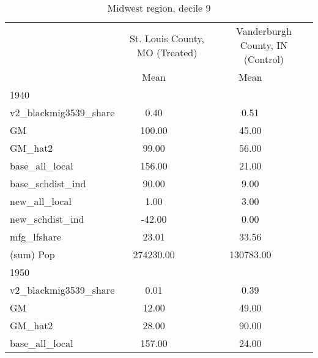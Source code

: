 \begin{table}[htbp]\centering
\def\sym#1{\ifmmode^{#1}\else\(^{#1}\)\fi}
\caption{Midwest region, decile 9 \label{tab1}}
\begin{tabular}{l*{2}{ccc}}
\toprule
                    &\multicolumn{3}{c}{St. Louis County, MO (Treated)}&\multicolumn{3}{c}{Vanderburgh County, IN (Control)}\\
                    &        Mean&            &            &        Mean&            &            \\
\midrule
1940                &            &            &            &            &            &            \\
v2\_blackmig3539\_share&        0.40&            &            &        0.51&            &            \\
GM                  &      100.00&            &            &       45.00&            &            \\
GM\_hat2             &       99.00&            &            &       56.00&            &            \\
base\_all\_local      &      156.00&            &            &       21.00&            &            \\
base\_schdist\_ind    &       90.00&            &            &        9.00&            &            \\
new\_all\_local       &        1.00&            &            &        3.00&            &            \\
new\_schdist\_ind     &      -42.00&            &            &        0.00&            &            \\
mfg\_lfshare         &       23.01&            &            &       33.56&            &            \\
(sum) Pop           &   274230.00&            &            &   130783.00&            &            \\
\midrule
1950                &            &            &            &            &            &            \\
v2\_blackmig3539\_share&        0.01&            &            &        0.39&            &            \\
GM                  &       12.00&            &            &       49.00&            &            \\
GM\_hat2             &       28.00&            &            &       90.00&            &            \\
base\_all\_local      &      157.00&            &            &       24.00&            &            \\

\end{tabular}
\end{table}
